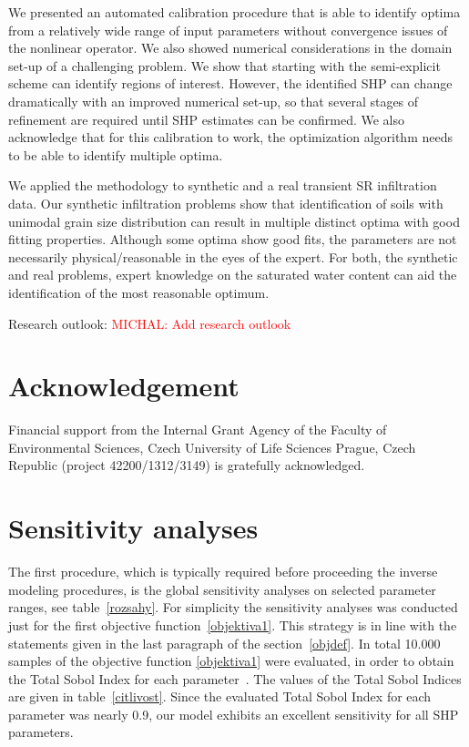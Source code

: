 \documentclass[review,times,3p,twocolumn,10pt]{elsarticle}
\begin{document}
We presented an automated calibration procedure that is able to identify optima from a relatively wide range of input parameters without convergence issues of the nonlinear operator. We also showed numerical considerations in the domain set-up of a challenging problem. We show that starting with the semi-explicit scheme can identify regions of interest. However, the identified SHP can change dramatically with an improved numerical set-up, so that several stages of refinement are required until SHP estimates can be confirmed. We also acknowledge that for this calibration to work, the optimization algorithm needs to be able to identify multiple optima. 

We applied the methodology to synthetic and a real transient SR infiltration data. Our synthetic infiltration problems show that identification of soils with unimodal grain size distribution can result in multiple distinct optima with good fitting properties. Although some optima show good fits, the parameters are not necessarily physical/reasonable in the eyes of the expert. For both, the synthetic and real problems, expert knowledge on the saturated water content can aid the identification of the most reasonable optimum. 

Research outlook:
\textcolor{red}{\huge{MICHAL: Add research outlook}}



\section{Acknowledgement}

Financial support from the Internal Grant Agency of the Faculty of Environmental Sciences, Czech University of Life Sciences Prague, Czech Republic (project 42200/1312/3149) is gratefully acknowledged.




 


\appendix
 \section{Sensitivity analyses} 

The first procedure, which is typically required before proceeding the inverse modeling procedures, is the global sensitivity analyses on  selected parameter ranges, see table~\ref{rozsahy}. For simplicity the sensitivity analyses was conducted just for the first objective function~\eqref{objektiva1}. This strategy is in line with the statements given in the last paragraph of the section~\ref{objdef}. In total 10.000 samples of the objective function \eqref{objektiva1}  were evaluated, in order to obtain the  Total Sobol Index for each parameter~\citep{kniha-citlivost}. The values of the Total Sobol Indices are given in table~\ref{citlivost}. Since the evaluated Total Sobol Index for each parameter was nearly 0.9, our model exhibits an excellent sensitivity for all SHP parameters. 
\end{document}

